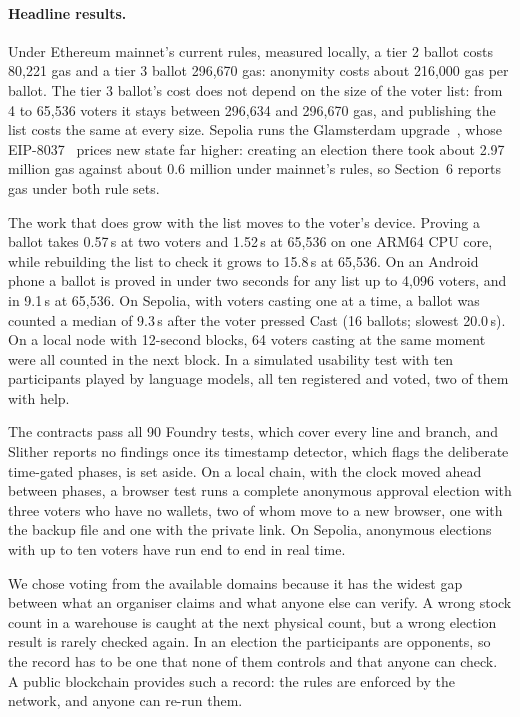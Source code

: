 \paragraph{Headline results.}
Under Ethereum mainnet's current rules, measured locally, a tier 2 ballot costs
80,221 gas and a tier 3 ballot 296,670 gas: anonymity costs about 216,000 gas
per ballot. The tier 3 ballot's cost does not depend on the size of the voter
list: from 4 to 65,536 voters it stays between 296,634 and 296,670 gas, and
publishing the list costs the same at every size. Sepolia runs the Glamsterdam
upgrade~\cite{glamsterdam}, whose EIP-8037~\cite{eip8037} prices new state far
higher: creating an election there took about 2.97 million gas against about
0.6 million under mainnet's rules, so Section~6 reports gas under both rule
sets.

The work that does grow with the list moves to the voter's device. Proving a
ballot takes 0.57\,s at two voters and 1.52\,s at 65,536 on one ARM64 CPU
core, while rebuilding the list to check it grows to 15.8\,s at 65,536. On an
Android phone a ballot is proved in under two seconds for any list up to 4,096
voters, and in 9.1\,s at 65,536. On
Sepolia, with voters casting one at a time, a ballot was counted a median of
9.3\,s after the voter pressed Cast (16 ballots; slowest 20.0\,s). On a
local node with 12-second blocks, 64 voters casting at the same moment were all
counted in the next block.
In a simulated usability test with ten participants played by language models,
all ten registered and voted, two of them with help.

The contracts pass all 90 Foundry tests, which cover every line and branch, and Slither reports no findings once its timestamp
detector, which flags the deliberate time-gated phases, is set aside. On a
local chain, with the clock moved ahead between phases, a browser test runs a
complete anonymous approval election with three voters who have no wallets,
two of whom move to a new browser, one with the backup file and one with the
private link. On Sepolia, anonymous elections with up to ten voters have run
end to end in real time.

We chose voting from the available domains because it has the widest gap
between what an organiser claims and what anyone else can verify. A wrong stock
count in a warehouse is caught at the next physical count, but a wrong election
result is rarely checked again. In an election the participants are opponents,
so the record has to be one that none of them controls and that anyone can
check. A public blockchain provides such a record: the rules are enforced by
the network, and anyone can re-run them.

